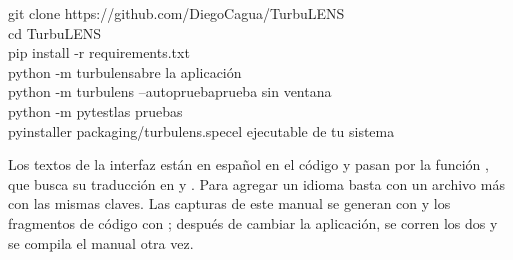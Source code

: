 \begin{tcolorbox}[enhanced,colback=codigofondo,colframe=grisclaro,boxrule=0.6pt,arc=1.5mm,fontupper=\ttfamily\small,
  left=4mm,top=2mm,bottom=2mm]
git clone https://github.com/DiegoCagua/TurbuLENS\\
cd TurbuLENS\\
pip install -r requirements.txt\\
python -m turbulens\hfill\normalfont\color{gris}abre la aplicación\\
\ttfamily python -m turbulens --autoprueba\hfill\normalfont\color{gris}prueba sin ventana\\
\ttfamily python -m pytest\hfill\normalfont\color{gris}las pruebas\\
\ttfamily pyinstaller packaging/turbulens.spec\hfill\normalfont\color{gris}el ejecutable de tu sistema
\end{tcolorbox}

Los textos de la interfaz están en español en el código y pasan por la función , que busca su traducción en
 y . Para agregar un idioma basta con un archivo más con las mismas claves.
Las capturas de este manual se generan con  y los fragmentos de código con
; después de cambiar la aplicación, se corren los dos y se compila el manual otra vez.
